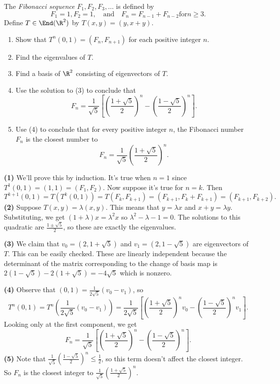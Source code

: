 \begin{problem}
  The {\em Fibonacci sequence} $F_1, F_2, F_3, \ldots$ is defined by 
  \[
    F_1=1, F_2=1, \quad \mathrm{ and } \quad F_n=F_{n-1}+F_{n-2} \mathrm{ for } n\geq 3
  .\] 
  Define $T\in \End(\R^2)$ by $T(x,y)=(y, x+y)$.  
  \begin{enumerate}
    \item Show that $T^n(0,1)=(F_n, F_{n+1})$ for each positive integer $n$.
    \item Find the eigenvalues of $T$.
    \item Find a basis of $\R^2$ consisting of eigenvectors of $T$.
    \item Use the solution to (3) to conclude that
    \[
      F_n = \frac{1}{\sqrt{5}}\left[\left(\frac{1+\sqrt{5}}{2}\right)^n-\left(\frac{1-\sqrt{5}}{2}\right)^n\right]
    .\]   
    \item Use (4) to conclude that for every positive integer $n$, the Fibonacci number $F_n$ is the closest number to 
    \[
      F_n = \frac{1}{\sqrt{5}}\left(\frac{1+\sqrt{5}}{2}\right)^n
    .\]  
  \end{enumerate}
\end{problem}
\textbf{(1)} We'll prove this by induction. It's true when $n=1$ since $T^1(0,1)=(1,1)=(F_1,F_2)$. Now suppose it's true for $n=k$. Then 
\[T^{k+1}(0,1)=T(T^k(0,1))=T(F_k, F_{k+1})=(F_{k+1}, F_k+F_{k+1})=(F_{k+1}, F_{k+2}).\]
\textbf{(2)} Suppose $T(x,y)=\lambda(x,y)$. This means that $y=\lambda x$ and $x+y=\lambda y$. Substituting, we get $(1+\lambda)x=\lambda^2x$ so $\lambda^2-\lambda-1=0$. The solutions to this quadratic are $\frac{1\pm\sqrt{5}}{2}$, so these are exactly the eigenvalues.

\textbf{(3)} We claim that $v_0=(2, 1+\sqrt{5})$ and $v_1=(2, 1-\sqrt{5})$ are eigenvectors of $T$. This can be easily checked. These are linearly independent because the determinant of the matrix corresponding to the change of basis map is $2(1-\sqrt{5})-2(1+\sqrt{5})=-4\sqrt{5}$ which is nonzero.

\textbf{(4)} Observe that $(0,1)=\frac{1}{2\sqrt{5}}(v_0-v_1)$, so
\[
  T^n(0,1)=T^n\left(\frac{1}{2\sqrt{5}}(v_0-v_1)\right)=\frac{1}{2\sqrt{5}}\left[\left(\frac{1+\sqrt{5}}{2}\right)^nv_0-\left(\frac{1-\sqrt{5}}{2}\right)^nv_1\right]
.\]  
Looking only at the first component, we get 
\[
  F_n = \frac{1}{\sqrt{5}}\left[\left(\frac{1+\sqrt{5}}{2}\right)^n-\left(\frac{1-\sqrt{5}}{2}\right)^n\right]
.\]
\textbf{(5)} Note that $\frac{1}{\sqrt{5}}\left(\frac{1-\sqrt{5}}{2}\right)^n\leq \frac{1}{2}$, so this term doesn't affect the closest integer. So $F_n$ is the closest integer to $\frac{1}{\sqrt{5}}\left(\frac{1+\sqrt{5}}{2}\right)^n$.
